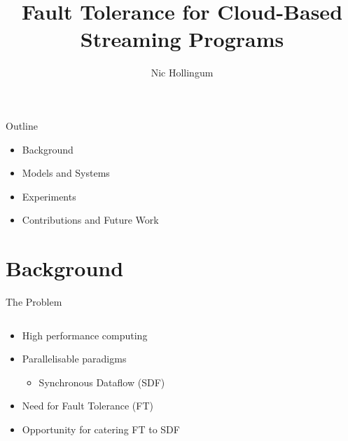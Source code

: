 \documentclass{beamer}
\title[SDF]{Fault Tolerance for Cloud-Based Streaming Programs}
\author{Nic Hollingum}
\institute{USYD}
\begin{document}
\begin{frame}
\titlepage
\end{frame}

\begin{frame}{Outline}
\begin{itemize}
	\item Background
	\item Models and Systems
	\item Experiments
	\item Contributions and Future Work
\end{itemize}
\end{frame}

\section{Background}

\begin{frame}{The Problem}
\begin{columns}
\begin{column}{5cm}
\begin{itemize}
	\item High performance computing
	\item Parallelisable paradigms
		\begin{itemize}
			\item Synchronous Dataflow (SDF)
		\end{itemize}
	\item Need for Fault Tolerance (FT)
	\item Opportunity for catering FT to SDF
\end{itemize}
\end{column}
\begin{column}{5cm}
\end{column}
\end{columns}
\end{frame}
\end{document}
